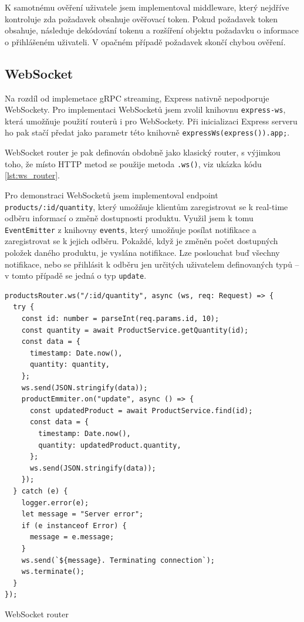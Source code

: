 \documentclass[thesis=M,czech]{FITthesis}[2019/12/23]
\begin{document}
K samotnému ověření uživatele jsem implementoval middleware, který nejdříve kontroluje zda požadavek obsahuje ověřovací token. Pokud požadavek token obsahuje, následuje dekódování tokenu a rozšíření objektu požadavku o informace o přihlášeném uživateli. V opačném případě požadavek skončí chybou ověření.


\subsection{WebSocket}
Na rozdíl od implemetace gRPC streaming, Express nativně nepodporuje WebSockety. Pro implementaci WebSocketů jsem zvolil knihovnu \texttt{express-ws}, která umožňuje použití routerů i pro WebSockety. Při inicializaci Express serveru ho pak stačí předat jako parametr této knihovně \texttt{expressWs(express()).app;}.

WebSocket router je pak definován obdobně jako klasický router, s výjimkou toho, že místo HTTP metod se použije metoda \texttt{.ws()}, viz ukázka kódu \ref{lst:ws_router}.

Pro demonstraci WebSocketů jsem implementoval endpoint \texttt{products/:id/quantity}, který umožňuje klientům zaregistrovat se k real-time odběru informací o změně dostupnosti produktu. Využil jsem k tomu \texttt{EventEmitter} z knihovny \texttt{events}, který umožňuje posílat notifikace a zaregistrovat se k jejich odběru. Pokaždé, když je změněn počet dostupných položek daného produktu, je vyslána notifikace. Lze poslouchat buď všechny notifikace, nebo se přihlásit k odběru jen určitých uživatelem definovaných typů -- v tomto případě se jedná o typ \texttt{update}.

\begin{listing}[h]
\begin{verbatim}
productsRouter.ws("/:id/quantity", async (ws, req: Request) => {
  try {
    const id: number = parseInt(req.params.id, 10);
    const quantity = await ProductService.getQuantity(id);
    const data = {
      timestamp: Date.now(),
      quantity: quantity,
    };
    ws.send(JSON.stringify(data));
    productEmmiter.on("update", async () => {
      const updatedProduct = await ProductService.find(id);
      const data = {
        timestamp: Date.now(),
        quantity: updatedProduct.quantity,
      };
      ws.send(JSON.stringify(data));
    });
  } catch (e) {
    logger.error(e);
    let message = "Server error";
    if (e instanceof Error) {
      message = e.message;
    }
    ws.send(`${message}. Terminating connection`);
    ws.terminate();
  }
});
\end{verbatim}
\caption{WebSocket router}
\label{lst:ws_router}
\end{listing}
\end{document}

